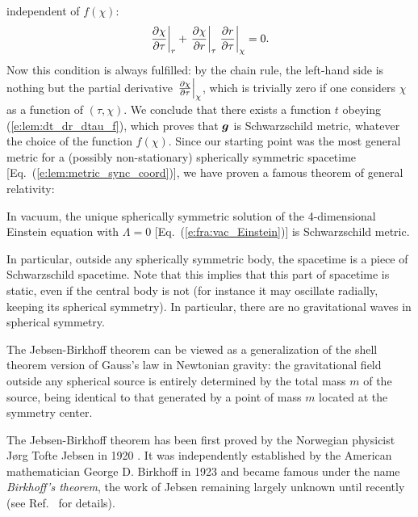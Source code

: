 independent of $f(\chi)$:
\[
    \left. \frac{\partial \chi}{\partial \tau} \right| _r  +
    \left. \frac{\partial \chi}{\partial r} \right| _\tau \left. \frac{\partial r}{\partial \tau} \right| _\chi = 0 .
\]
Now this condition is always fulfilled:
by the chain rule, the left-hand side is nothing but the partial derivative
$\left. \frac{\partial \chi}{\partial \tau} \right| _\chi$, which is trivially zero
if one considers $\chi$ as a function of $(\tau,\chi)$.
We conclude that there exists a function $t$ obeying
(\ref{e:lem:dt_dr_dtau_f}), which proves that $\bm{g}$ is
Schwarzschild metric, whatever the choice of the function $f(\chi)$.
Since our starting point was
the most general metric for a (possibly non-stationary) spherically symmetric spacetime
[Eq.~(\ref{e:lem:metric_sync_coord})], we have proven
a famous theorem of general relativity:

\begin{prop}
\label{p:lem:Birkhoff}
In vacuum, the unique spherically symmetric solution of the 4-dimensional
Einstein equation with $\Lambda=0$ [Eq.~(\ref{e:fra:vac_Einstein})]
is Schwarzschild metric.
\end{prop}

In particular, outside any spherically symmetric body, the spacetime
is a piece of Schwarz\-schild spacetime. Note that this implies that this part of
spacetime is static, even if the central body is not (for instance it may oscillate
radially, keeping its spherical symmetry). In particular, there are no
gravitational waves in spherical symmetry.
\begin{remark}
The Jebsen-Birkhoff theorem can be viewed as a generalization of the shell theorem version
of Gauss's law in Newtonian gravity:
the gravitational field outside any spherical source is entirely determined by the total
mass $m$ of the source, being identical to that generated by a point of mass $m$
located at the symmetry center.
\end{remark}

\begin{hist}
The Jebsen-Birkhoff theorem has been first proved by the Norwegian physicist
Jørg Tofte Jebsen in 1920 \cite{Jebse1921}. It was independently established by the American mathematician George D. Birkhoff in 1923 \cite{Birkh1923} and became famous under the
name \emph{Birkhoff's theorem}, the work of Jebsen remaining largely unknown until recently (see Ref.~\cite{JohanR06} for details).
\end{hist}

